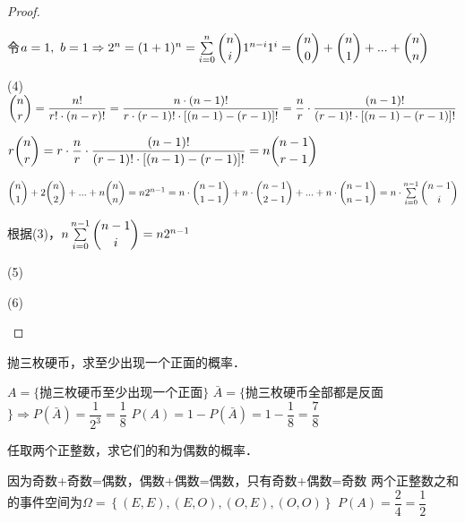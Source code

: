 \documentclass[lang=cn,newtx,10pt,scheme=chinese]{elegantbook}
\begin{document}
\begin{problemset}[习题 1.2]
\begin{proof}
\begin{framed}
            \item[] 令$a=1,\ b=1 \Rightarrow 2^n=(1+1)^n = \sum\limits_{i=0}^{n} \dbinom{n}{i}1^{n-i}1^{i} = \dbinom{n}{0}+\dbinom{n}{1}+...+\dbinom{n}{n}$ \vspace{6pt}
            \item[(4)] $\dbinom{n}{r} = \dfrac{n!}{r! \cdot (n-r)!}=\dfrac{n \cdot (n-1)!}{r \cdot (r-1)! \cdot [(n-1)-(r-1)]!} = \dfrac{n}{r} \cdot \dfrac{(n-1)!}{(r-1)! \cdot [(n-1)-(r-1)]!} $\vspace{6pt}
            \item[] $r\dbinom{n}{r} = r \cdot \dfrac{n}{r} \cdot \dfrac{(n-1)!}{(r-1)! \cdot [(n-1)-(r-1)]!} = n\dbinom{n-1}{r-1}$\vspace{6pt}
            \item[] $\dbinom{n}{1} + 2\dbinom{n}{2} + ... + n\dbinom{n}{n} = n2^{n-1} = n \cdot \dbinom{n-1}{1-1} + n \cdot \dbinom{n-1}{2-1} + ... + n \cdot \dbinom{n-1}{n-1} = n \cdot \sum\limits_{i=0}^{n-1}\dbinom{n-1}{i}$\vspace{6pt}
            \item[] 根据(3)，$n\sum\limits_{i=0}^{n-1}\dbinom{n-1}{i}=n2^{n-1}$\vspace{6pt}
            \item[(5)] $ $\vspace{6pt}
            \item[(6)] $ $\vspace{6pt}
        \end{framed}
    \end{proof}

    \item 抛三枚硬币，求至少出现一个正面的概率．
    \begin{solution}
        \begin{framed}
            $A=\{$抛三枚硬币至少出现一个正面$\}$\newline
            $\bar{A}=\{$抛三枚硬币全部都是反面$\} \Rightarrow P(\bar{A})=\dfrac{1}{2^3}=\dfrac{1}{8}$\newline
            $P(A) = 1- P(\bar{A}) = 1-\dfrac{1}{8} = \dfrac{7}{8}$
        \end{framed}
    \end{solution}

    \item 任取两个正整数，求它们的和为偶数的概率．
    \begin{solution}
        \begin{framed}
            因为奇数+奇数=偶数，偶数+偶数=偶数，只有奇数+偶数=奇数\newline\vspace{6pt}
            两个正整数之和的事件空间为$\Omega=\left\{(E,E),(E,O),(O,E),(O,O)\right\}$\newline\vspace{6pt}
            $P(A)=\dfrac{2}{4}=\dfrac{1}{2}$\vspace{6pt}
        \end{framed}
    \end{solution}


\end{problemset}
\end{document}
